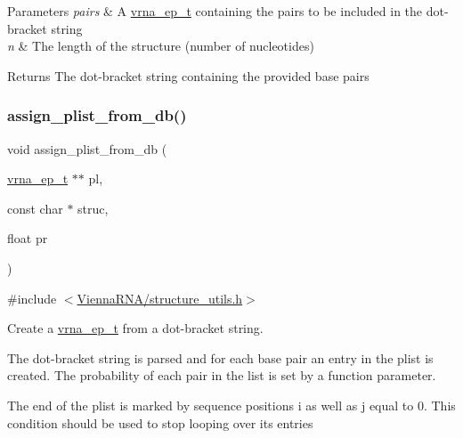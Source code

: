 \begin{DoxyParams}{Parameters}
{\em pairs} & A \hyperlink{group__struct__utils_gab9ac98ab55ded9fb90043b024b915aca}{vrna\+\_\+ep\+\_\+t} containing the pairs to be included in the dot-\/bracket string \\
\hline
{\em n} & The length of the structure (number of nucleotides) \\
\hline
\end{DoxyParams}
\begin{DoxyReturn}{Returns}
The dot-\/bracket string containing the provided base pairs 
\end{DoxyReturn}
\mbox{\label{group__struct__utils_gab61df77cf7949cd516181fce0c3d7d78}} 
\subsubsection{\texorpdfstring{assign\+\_\+plist\+\_\+from\+\_\+db()}{assign\_plist\_from\_db()}}
{\footnotesize\ttfamily void assign\+\_\+plist\+\_\+from\+\_\+db (\begin{DoxyParamCaption}\item[{\hyperlink{group__struct__utils_gab9ac98ab55ded9fb90043b024b915aca}{vrna\+\_\+ep\+\_\+t} $\ast$$\ast$}]{pl,  }\item[{const char $\ast$}]{struc,  }\item[{float}]{pr }\end{DoxyParamCaption})}



{\ttfamily \#include $<$\hyperlink{structure__utils_8h}{Vienna\+R\+N\+A/structure\+\_\+utils.\+h}$>$}



Create a \hyperlink{group__struct__utils_gab9ac98ab55ded9fb90043b024b915aca}{vrna\+\_\+ep\+\_\+t} from a dot-\/bracket string. 

The dot-\/bracket string is parsed and for each base pair an entry in the plist is created. The probability of each pair in the list is set by a function parameter.

The end of the plist is marked by sequence positions i as well as j equal to 0. This condition should be used to stop looping over its entries


